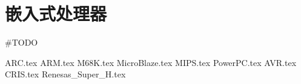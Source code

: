 \section{嵌入式处理器}

\#TODO

{ARC.tex}
{ARM.tex}
{M68K.tex}
{MicroBlaze.tex}
{MIPS.tex}
{PowerPC.tex}
{AVR.tex}
{CRIS.tex}
{Renesas_Super_H.tex}
